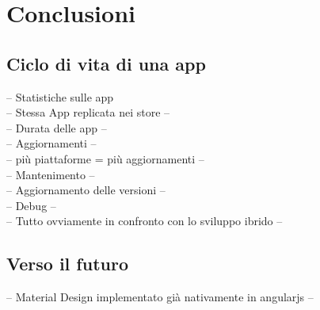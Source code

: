 \chapter{Conclusioni}
\section{Ciclo di vita di una app}
-- Statistiche sulle app\\
	-- Stessa App replicata nei store --\\
	-- Durata delle app --\\
-- Aggiornamenti --\\
	-- più piattaforme = più aggiornamenti --\\
-- Mantenimento --\\
	-- Aggiornamento delle versioni --\\
	-- Debug --\\
-- Tutto ovviamente in confronto con lo sviluppo ibrido --
\section{Verso il futuro}
-- Material Design implementato già nativamente in angularjs --